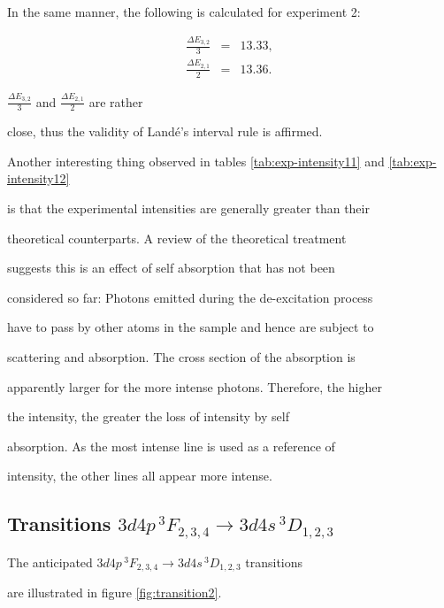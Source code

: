 \documentclass[a4paper]{article}
\begin{document}
In the same manner, the following is calculated for experiment 2:

\begin{eqnarray*}

\frac{\Delta E_{3,2}}{3} &=& 13.33, \\

\frac{\Delta E_{2,1}}{2} &=& 13.36.

\end{eqnarray*}

$\frac{\Delta E_{3,2}}{3}$ and $\frac{\Delta E_{2,1}}{2}$ are rather

close, thus the validity of Land\'e's interval rule is affirmed.

Another interesting thing observed in tables \ref{tab:exp-intensity11} and \ref{tab:exp-intensity12}

is that the experimental intensities are generally greater than their

theoretical counterparts. A review of the theoretical treatment

suggests this is an effect of self absorption that has not been

considered so far: Photons emitted during the de-excitation process

have to pass by other atoms in the sample and hence are subject to

scattering and absorption. The cross section of the absorption is

apparently larger for the more intense photons. Therefore, the higher

the intensity, the greater the loss of intensity by self

absorption. As the most intense line is used as a reference of

intensity, the other lines all appear more intense.

\subsection{Transitions $3d4p\,^3F_{2,3,4} \to 3d4s\,^3D_{1,2,3}$}

The anticipated $3d4p\,^3F_{2,3,4} \to 3d4s\,^3D_{1,2,3}$ transitions

are illustrated in figure \ref{fig:transition2}.
\end{document}
